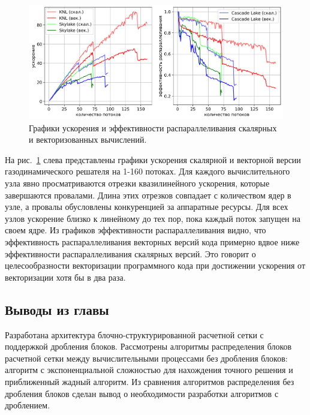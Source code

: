 \begin{figure}[ht]
\centering
\includegraphics[width=1.0\textwidth]{./fig/par_openmp_scalar_vec_chart_big.png}
\singlespacing
\caption{Графики ускорения и эффективности распараллеливания скалярных и векторизованных вычислений.}
\label{fig:text_3_omp2}
\end{figure}

На рис.~\ref{fig:text_3_omp2} слева представлены графики ускорения скалярной и векторной версии газодинамического решателя на 1-160 потоках.
Для каждого вычислительного узла явно просматриваются отрезки квазилинейного ускорения, которые завершаются провалами.
Длина этих отрезков совпадает с количеством ядер в узле, а провалы обусловлены конкуренцией за аппаратные ресурсы.
Для всех узлов ускорение близко к линейному до тех пор, пока каждый поток запущен на своем ядре.
Из графиков эффективности распараллеливания видно, что эффективность распараллеливания векторных версий кода примерно вдвое ниже эффективности распараллеливания скалярных версий.
Это говорит о целесообразности векторизации программного кода при достижении ускорения от векторизации хотя бы в два раза.


\subsection{Выводы из главы}

Разработана архитектура блочно-структурированной расчетной сетки с поддержкой дробления блоков.
Рассмотрены алгоритмы распределения блоков расчетной сетки между вычислительными процессами без дробления блоков: алгоритм с экспоненциальной сложностью для нахождения точного решения и приближенный жадный алгоритм.
Из сравнения алгоритмов распределения без дробления блоков сделан вывод о необходимости разработки алгоритмов с дроблением.

